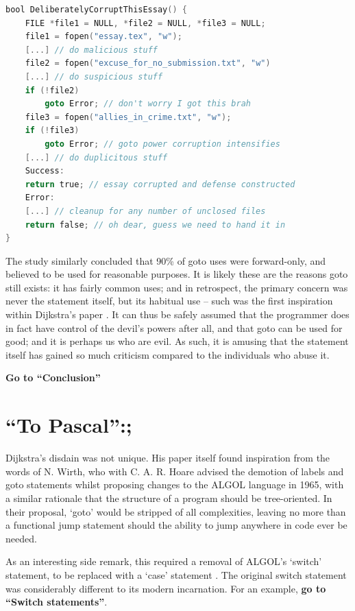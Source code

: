 \documentclass{journal}
\begin{document}
\begin{lstlisting}[language=C,caption={An example of goto used for error handling (C)}]
bool DeliberatelyCorruptThisEssay() {
	FILE *file1 = NULL, *file2 = NULL, *file3 = NULL;
	file1 = fopen("essay.tex", "w");
	[...] // do malicious stuff
	file2 = fopen("excuse_for_no_submission.txt", "w")
	[...] // do suspicious stuff
	if (!file2)
		goto Error; // don't worry I got this brah
	file3 = fopen("allies_in_crime.txt", "w");
	if (!file3)
		goto Error; // goto power corruption intensifies
	[...] // do duplicitous stuff
	Success:
	return true; // essay corrupted and defense constructed
	Error:
	[...] // cleanup for any number of unclosed files
	return false; // oh dear, guess we need to hand it in
}
\end{lstlisting}

The study similarly concluded that 90\% of goto uses were forward-only, and believed to be used for reasonable purposes. It is likely these are the reasons goto still exists: it has fairly common uses; and in retrospect, the primary concern was never the statement itself, but its habitual use -- such was the first inspiration within Dijkstra's paper \cite{goto}. It can thus be safely assumed that the programmer does in fact have control of the devil's powers after all, and that goto can be used for good; and it is perhaps us who are evil. As such, it is amusing that the statement itself has gained so much criticism compared to the individuals who abuse it.

\textbf{Go to ``Conclusion''}

\setcounter{section}{1}
\section{``To Pascal'':;}
Dijkstra's disdain was not unique. His paper itself found inspiration from the words of N. Wirth, who with C. A. R. Hoare \cite{algolwirth} advised the demotion of labels and goto statements whilst proposing changes to the ALGOL language in 1965, with a similar rationale that the structure of a program should be tree-oriented. In their proposal, `goto' would be stripped of all complexities, leaving no more than a functional jump statement should the ability to jump anywhere in code ever be needed.

As an interesting side remark, this required a removal of ALGOL's `switch' statement, to be replaced with a `case' statement \cite{algolwirth}. The original switch statement was considerably different to its modern incarnation. For an example, \textbf{go to ``Switch statements''}.
\end{document}
